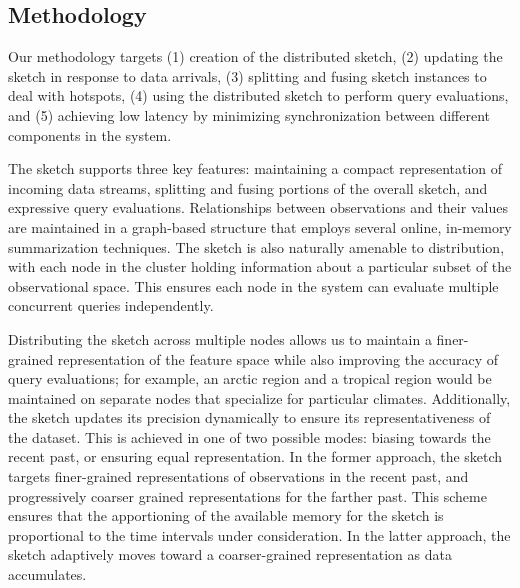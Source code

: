 \subsection{Methodology}
Our methodology targets (1) creation of the distributed sketch, (2) updating the sketch in response to data arrivals, (3) splitting and fusing sketch instances to deal with hotspots, (4) using the distributed sketch to perform query evaluations, and (5) achieving low latency by minimizing synchronization between different components in the system. 

The sketch supports three key features: maintaining a compact representation of incoming data streams, splitting and fusing portions of the overall sketch, and expressive query evaluations. Relationships between observations and their values are maintained in a graph-based structure that employs several online, in-memory summarization techniques. The sketch is also naturally amenable to distribution, with each node in the cluster holding information about a particular subset of the observational space.  This ensures each node in the system can evaluate multiple concurrent queries independently.

Distributing the sketch across multiple nodes allows us to maintain a finer-grained representation of the feature space while also improving the accuracy of query evaluations; for example, an arctic region and a tropical region would be maintained on separate nodes that specialize for particular climates. Additionally, the sketch updates its precision dynamically to ensure its representativeness of the dataset. This is achieved in one of two possible modes: biasing towards the recent past, or ensuring equal representation. In the former approach, the sketch targets finer-grained representations of observations in the recent past, and progressively coarser grained representations for the farther past. This scheme ensures that the apportioning of the available memory for the sketch is proportional to the time intervals under consideration.  In the latter approach, the sketch adaptively moves toward a coarser-grained representation as data accumulates.


